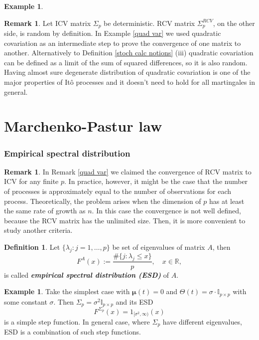 \documentclass[a4paper,11pt]{article}
\theoremstyle{plain}
\theoremstyle{definition}
\newtheorem{defn}[thm]{Definition}
\newtheorem{exmp}[thm]{Example}
\newtheorem{rmrk}[thm]{Remark}
\newcommand{\MR}{\mathbb{R}}
\newcommand{\define}[1]{\textit{\textbf{#1}}}
\begin{document}
\begin{exmp}
		\begin{rmrk}
			Let ICV matrix $\Sigma_p$ be deterministic. RCV matrix $\Sigma_p^{RCV}$, on the other side, is random by definition. In Example \ref{quad var} we used quadratic covariation as an intermediate step to prove the convergence of one matrix to another. Alternatively to Definition \ref{stoch calc notions} (iii) quadratic covariation can be defined as a limit of the sum of squared differences, so it is also random. Having almost sure degenerate distribution of quadratic covariation is one of the major properties of Itô processes and it doesn't need to hold for all martingales in general.
		\end{rmrk}
		
	\end{exmp}
	
	\pagebreak
	\part{Marchenko-Pastur law}
	\section*{Empirical spectral distribution}
	\begin{rmrk}
		In Remark \ref{quad var} we claimed the convergence of RCV matrix to ICV for any finite $p$. In practice, however, it might be the case that the number of processes is approximately equal to the number of observations for each process. Theoretically, the problem arises when the dimension of $p$ has at least the same rate of growth as $n$. In this case the convergence is not well defined, because the RCV matrix has the unlimited size.
		Then, it is more convenient to study another criteria.
	\end{rmrk}
	
	\begin{defn}
		Let $\{\lambda_j:j=1,\dots, p\}$ be set of eigenvalues of matrix $A$, then
		\[F^{A}(x) := \frac{\#\{j:\lambda_j \leq x\}}{p}, \quad x \in \MR, \]
		is called \define{empirical spectral distribution (ESD)} of $A$.
	\end{defn}
	
	\begin{exmp} \label{ESD finite p}
		Take the simplest case with $\boldsymbol{\mu}(t) = 0$ and $\Theta(t) = \sigma \cdot \mathbb{I}_{p \times p}$ with some constant $\sigma$. Then $\Sigma_p = \sigma^2 \mathbb{I}_{p \times p}$ and its ESD
		\[ F^{\Sigma_p}(x) = 1_{[\sigma^2, \infty)}(x) \]
		is a simple step function. In general case, where $\Sigma_p$ have different eigenvalues, ESD is a combination of such step functions.
	\end{exmp}
	
\end{document}
